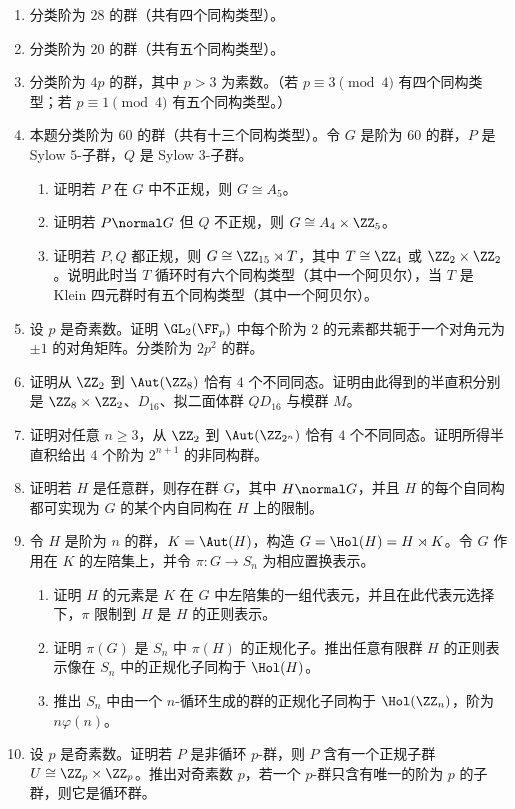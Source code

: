 \begin{enumerate}[label=\arabic*.]
  \item 分类阶为 $28$ 的群（共有四个同构类型）。
  \item 分类阶为 $20$ 的群（共有五个同构类型）。
  \item 分类阶为 $4p$ 的群，其中 $p>3$ 为素数。（若 $p\equiv3\pmod4$ 有四个同构类型；若 $p\equiv1\pmod4$ 有五个同构类型。）
  \item 本题分类阶为 $60$ 的群（共有十三个同构类型）。令 $G$ 是阶为 $60$ 的群，$P$ 是 Sylow $5$-子群，$Q$ 是 Sylow $3$-子群。
  \begin{enumerate}[label=(\alph*)]
    \item 证明若 $P$ 在 $G$ 中不正规，则 $G\cong A_5$。
    \item 证明若 $P\normal G$ 但 $Q$ 不正规，则 $G\cong A_4\times\ZZ_5$。
    \item 证明若 $P,Q$ 都正规，则 $G\cong\ZZ_{15}\rtimes T$，其中 $T\cong\ZZ_4$ 或 $\ZZ_2\times\ZZ_2$。说明此时当 $T$ 循环时有六个同构类型（其中一个阿贝尔），当 $T$ 是 Klein 四元群时有五个同构类型（其中一个阿贝尔）。
  \end{enumerate}
  \item 设 $p$ 是奇素数。证明 $\GL_2(\FF_p)$ 中每个阶为 $2$ 的元素都共轭于一个对角元为 $\pm1$ 的对角矩阵。分类阶为 $2p^2$ 的群。
  \item 证明从 $\ZZ_2$ 到 $\Aut(\ZZ_8)$ 恰有 $4$ 个不同同态。证明由此得到的半直积分别是 $\ZZ_8\times\ZZ_2$、$D_{16}$、拟二面体群 $QD_{16}$ 与模群 $M$。
  \item 证明对任意 $n\geq3$，从 $\ZZ_2$ 到 $\Aut(\ZZ_{2^n})$ 恰有 $4$ 个不同同态。证明所得半直积给出 $4$ 个阶为 $2^{n+1}$ 的非同构群。
  \item 证明若 $H$ 是任意群，则存在群 $G$，其中 $H\normal G$，并且 $H$ 的每个自同构都可实现为 $G$ 的某个内自同构在 $H$ 上的限制。
  \item 令 $H$ 是阶为 $n$ 的群，$K=\Aut(H)$，构造 $G=\Hol(H)=H\rtimes K$。令 $G$ 作用在 $K$ 的左陪集上，并令 $\pi:G\to S_n$ 为相应置换表示。
  \begin{enumerate}[label=(\alph*)]
    \item 证明 $H$ 的元素是 $K$ 在 $G$ 中左陪集的一组代表元，并且在此代表元选择下，$\pi$ 限制到 $H$ 是 $H$ 的正则表示。
    \item 证明 $\pi(G)$ 是 $S_n$ 中 $\pi(H)$ 的正规化子。推出任意有限群 $H$ 的正则表示像在 $S_n$ 中的正规化子同构于 $\Hol(H)$。
    \item 推出 $S_n$ 中由一个 $n$-循环生成的群的正规化子同构于 $\Hol(\ZZ_n)$，阶为 $n\varphi(n)$。
  \end{enumerate}
  \item 设 $p$ 是奇素数。证明若 $P$ 是非循环 $p$-群，则 $P$ 含有一个正规子群 $U\cong\ZZ_p\times\ZZ_p$。推出对奇素数 $p$，若一个 $p$-群只含有唯一的阶为 $p$ 的子群，则它是循环群。

\end{enumerate}
